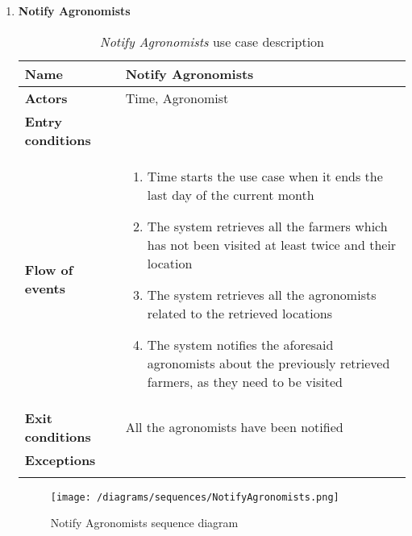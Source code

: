 \begin{enumerate}
			\item \textbf{Notify Agronomists}
				\begin{longtable}{p{0.26\linewidth}p{0.75\linewidth}}
					\toprule
					\textbf{Name} & \textbf{Notify Agronomists} \\
					\midrule
					\textbf{Actors} & Time, Agronomist \\
					\midrule
					\textbf{Entry conditions} & \\
					\midrule
					\textbf{Flow of events} & 
					\begin{enumerate}
						\item Time starts the use case when it ends the last day of the current month
						\item The system retrieves all the farmers which has not been visited at least twice and their location
						\item The system retrieves all the agronomists related to the retrieved locations
						\item The system notifies the aforesaid agronomists about the previously retrieved farmers, as they need to be visited
					\end{enumerate} \\
					\midrule
					\textbf{Exit conditions} & All the agronomists have been notified \\
					\midrule
					\textbf{Exceptions} &  \\
					\bottomrule
					\caption{\emph{Notify Agronomists} use case description}
				\end{longtable}
			
				\begin{figure}[hbtp]
					\centering
					\texttt{[image: /diagrams/sequences/NotifyAgronomists.png]}
					\caption{Notify Agronomists sequence diagram}
				\end{figure}
			

\end{enumerate}
